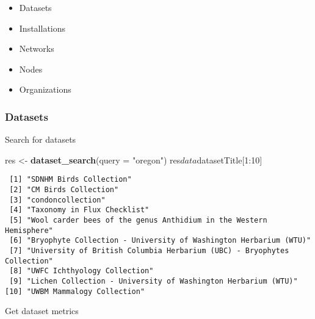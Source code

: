 \documentclass[author-year, review, 11pt]{components/elsarticle} %
\newenvironment{Shaded}{\begin{snugshade}}{\end{snugshade}}
\newcommand{\KeywordTok}[1]{\textcolor[rgb]{0.13,0.29,0.53}{\textbf{{#1}}}}
\newcommand{\DataTypeTok}[1]{\textcolor[rgb]{0.13,0.29,0.53}{{#1}}}
\newcommand{\DecValTok}[1]{\textcolor[rgb]{0.00,0.00,0.81}{{#1}}}
\newcommand{\StringTok}[1]{\textcolor[rgb]{0.31,0.60,0.02}{{#1}}}
\newcommand{\NormalTok}[1]{{#1}}
\begin{document}
\begin{itemize}
\itemsep1pt\parskip0pt
\item
  Datasets
\item
  Installations
\item
  Networks
\item
  Nodes
\item
  Organizations
\end{itemize}

\subsubsection{Datasets}\label{datasets}

Search for datasets

\begin{Shaded}
\begin{Highlighting}[]
\NormalTok{res <-}\StringTok{ }\KeywordTok{dataset_search}\NormalTok{(}\DataTypeTok{query =} \StringTok{"oregon"}\NormalTok{)}
\NormalTok{res$data$datasetTitle[}\DecValTok{1}\NormalTok{:}\DecValTok{10}\NormalTok{]}
\end{Highlighting}
\end{Shaded}

\begin{verbatim}
 [1] "SDNHM Birds Collection"                                                
 [2] "CM Birds Collection"                                                   
 [3] "condoncollection"                                                      
 [4] "Taxonomy in Flux Checklist"                                            
 [5] "Wool carder bees of the genus Anthidium in the Western Hemisphere"     
 [6] "Bryophyte Collection - University of Washington Herbarium (WTU)"       
 [7] "University of British Columbia Herbarium (UBC) - Bryophytes Collection"
 [8] "UWFC Ichthyology Collection"                                           
 [9] "Lichen Collection - University of Washington Herbarium (WTU)"          
[10] "UWBM Mammalogy Collection"                                             
\end{verbatim}

Get dataset metrics

\begin{Shaded}
\end{Shaded}
\end{document}
